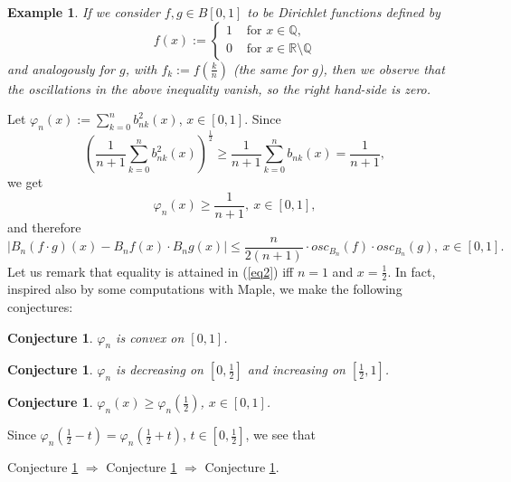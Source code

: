 \documentclass[12pt,leqno,a4paper,dvips,twoside]{article}
\newcommand*{\R}{\ensuremath{\mathbb{R}}}               %
\newcommand*{\Q}{\ensuremath{\mathbb{Q}}}               %
\newtheorem{conj}[thm]{Conjecture}%
\newtheorem{exem}[thm]{Example}%
\begin{document}
{\begin{exem}
If we consider $f,g\in B[0,1]$ to be Dirichlet functions defined by
		\begin{equation*}
			f(x):=\begin{cases}
				1 & \text{ for } x\in \Q,\\
				0 & \text{ for }x\in \R\setminus\Q
			\end{cases}
		\end{equation*}
and analogously for $g$,  with $f_k:=f\left(\frac{k}{n}\right)$ (the same for $g$), then we observe that 	the oscillations in the above inequality vanish, so the right hand-side is zero. 	
\end{exem}

Let $\varphi_n(x):=\sum^{n}_{k=0}{b^2_{nk}(x)}$, $x\in [0,1]$. Since
	\begin{equation*}
		\left(\frac{1}{n+1}\sum^{n}_{k=0}{b^2_{nk}(x)}\right)^{\frac{1}{2}}\geq \frac{1}{n+1}\sum^{n}_{k=0}{b_{nk}(x)}=\frac{1}{n+1},
	\end{equation*}	
we get
	\begin{equation}\label{eq2}
		\varphi_n(x)\geq \frac{1}{n+1},\ x\in [0,1],
	\end{equation}
and therefore
	\begin{equation}\label{eqbeta}
		\left|B_n(f\cdot g)(x)-B_nf(x)\cdot B_ng(x)\right|\leq\frac{n}{2(n+1)}\cdot osc_{B_n}(f)\cdot osc_{B_n}(g),\ x\in [0,1].
	\end{equation}	
Let us remark that equality is attained in (\ref{eq2}) iff $n=1$ and $x=\frac{1}{2}$. In fact, inspired also by some computations with Maple, we
make the following conjectures:

\begin{conj}\label{c1}
	$\varphi_n$ is convex on $[0,1]$.
\end{conj}

\begin{conj}\label{c2}
	$\varphi_n$ is decreasing on $\left[0,\frac{1}{2}\right]$ and increasing on $\left[\frac{1}{2},1\right]$.
\end{conj}

\begin{conj}\label{c3}
	$\varphi_n(x)\geq \varphi_n\left(\frac{1}{2}\right)$, $x\in [0,1]$.
\end{conj}

Since $\varphi_n\left(\frac{1}{2}-t\right)=\varphi_n\left(\frac{1}{2}+t\right)$, $t\in \left[0,\frac{1}{2}\right]$, we see that 

Conjecture \ref{c1} $\Rightarrow$ Conjecture \ref{c2} $\Rightarrow$ Conjecture \ref{c3}.

}
\end{document}
